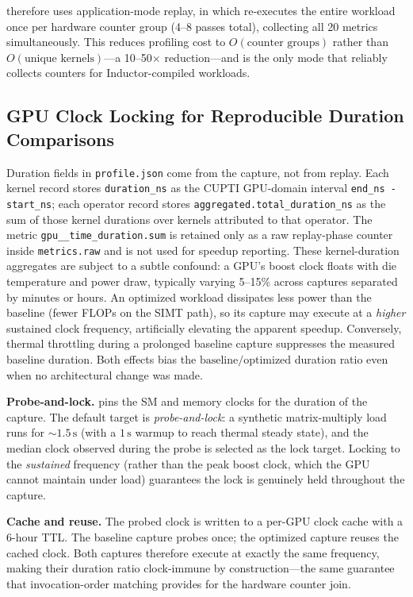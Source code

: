 \sys therefore uses application-mode replay, in which \ncu re-executes the entire workload
once per hardware counter group (4--8 passes total), collecting all 20 metrics simultaneously.
This reduces profiling cost to $O(\text{counter groups})$ rather than $O(\text{unique kernels})$---a
10--50$\times$ reduction---and is the only mode that reliably collects counters for
Inductor-compiled workloads.

\subsection{GPU Clock Locking for Reproducible Duration Comparisons}
\label{sec:clocklocking}

Duration fields in \texttt{profile.json} come from the \nsys capture, not from
\ncu replay.  Each kernel record stores \texttt{duration\_ns} as the CUPTI
GPU-domain interval \texttt{end\_ns - start\_ns}; each operator record stores
\texttt{aggregated.total\_duration\_ns} as the sum of those \nsys kernel durations
over kernels attributed to that operator.  The \ncu metric
\texttt{gpu\_\_time\_duration.sum} is retained only as a raw replay-phase counter
inside \texttt{metrics.raw} and is not used for speedup reporting.  These
kernel-duration aggregates are subject to a subtle confound: a GPU's boost clock
floats with die temperature and power draw, typically varying 5--15\% across
captures separated by minutes or hours.  An optimized workload dissipates less
power than the baseline (fewer FLOPs on the SIMT path), so its capture may
execute at a \emph{higher} sustained clock frequency, artificially elevating the
apparent speedup.  Conversely, thermal throttling during a prolonged baseline
capture suppresses the measured baseline duration.  Both effects bias the
$\text{baseline}/\text{optimized}$ duration ratio even when no architectural
change was made.

\textbf{Probe-and-lock.}
\sys pins the SM and memory clocks for the duration of the \nsys capture.  The default
target is \emph{probe-and-lock}: a synthetic matrix-multiply load runs for ${\sim}1.5\,\text{s}$
(with a $1\,\text{s}$ warmup to reach thermal steady state), and the median clock observed
during the probe is selected as the lock target.  Locking to the \emph{sustained} frequency
(rather than the peak boost clock, which the GPU cannot maintain under load) guarantees the
lock is genuinely held throughout the capture.

\textbf{Cache and reuse.}
The probed clock is written to a per-GPU clock cache with a 6-hour TTL.  The baseline capture probes once; the optimized capture reuses
the cached clock.  Both captures therefore execute at exactly the same frequency, making
their duration ratio clock-immune by construction---the same guarantee that invocation-order
matching provides for the hardware counter join.


